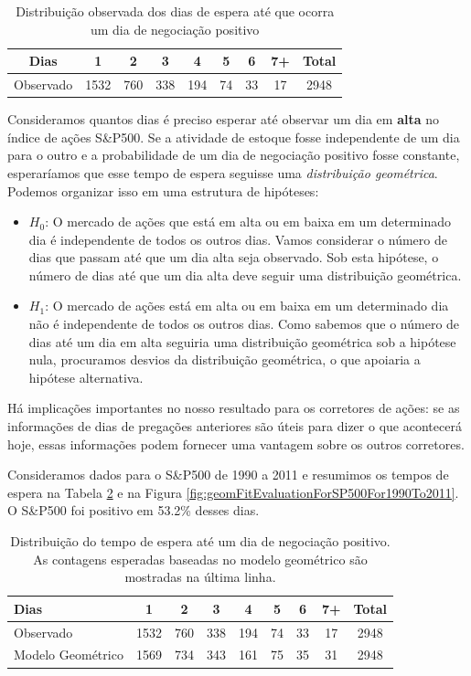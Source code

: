 \documentclass[
]{book}
\theoremstyle{definition}
\theoremstyle{definition}
\theoremstyle{definition}
\theoremstyle{definition}
\theoremstyle{remark}
\begin{document}
\begin{table}

\caption{\label{tab:sAndP500For1990To2011TimeToPosTrade}Distribuição observada dos dias de espera até que ocorra um dia de negociação positivo}
\centering
\begin{tabular}[t]{c|c|c|c|c|c|c|c|c}
\hline
Dias & 1 & 2 & 3 & 4 & 5 & 6 & 7+ & Total\\
\hline
Observado & 1532 & 760 & 338 & 194 & 74 & 33 & 17 & 2948\\
\hline
\end{tabular}
\end{table}

Consideramos quantos dias é preciso esperar até observar um dia em \textbf{alta} no índice de ações S\&P500. Se a atividade de estoque fosse independente de um dia para o outro e a probabilidade de um dia de negociação positivo fosse constante, esperaríamos que esse tempo de espera seguisse uma \emph{distribuição geométrica}. Podemos organizar isso em uma estrutura de hipóteses:

\begin{itemize}
\item
  \(H_0\): O mercado de ações que está em alta ou em baixa em um determinado dia é independente de todos os outros dias. Vamos considerar o número de dias que passam até que um dia alta seja observado. Sob esta hipótese, o número de dias até que um dia alta deve seguir uma distribuição geométrica.
\item
  \(H_1\): O mercado de ações está em alta ou em baixa em um determinado dia não é independente de todos os outros dias. Como sabemos que o número de dias até um dia em alta seguiria uma distribuição geométrica sob a hipótese nula, procuramos desvios da distribuição geométrica, o que apoiaria a hipótese alternativa.
\end{itemize}

Há implicações importantes no nosso resultado para os corretores de ações: se as informações de dias de pregações anteriores são úteis para dizer o que acontecerá hoje, essas informações podem fornecer uma vantagem sobre os outros corretores.

Consideramos dados para o S\&P500 de 1990 a 2011 e resumimos os tempos de espera na Tabela \ref{tab:sAndP500For1990To2011TimeToPosTrade2} e na Figura \ref{fig:geomFitEvaluationForSP500For1990To2011}. O S\&P500 foi positivo em 53.2\% desses dias.

\begin{table}

\caption{\label{tab:sAndP500For1990To2011TimeToPosTrade2}Distribuição do tempo de espera até um dia de negociação positivo. As contagens esperadas baseadas no modelo geométrico são mostradas na última linha.}
\centering
\begin{tabular}[t]{l|c|c|c|c|c|c|c|c}
\hline
Dias & 1 & 2 & 3 & 4 & 5 & 6 & 7+ & Total\\
\hline
Observado & 1532 & 760 & 338 & 194 & 74 & 33 & 17 & 2948\\
\hline
Modelo Geométrico & 1569 & 734 & 343 & 161 & 75 & 35 & 31 & 2948\\
\hline
\end{tabular}
\end{table}
\end{document}
